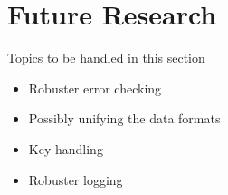 \section{Future Research}

Topics to be handled in this section

\begin{itemize}
\item {Robuster  error checking}
\item {Possibly unifying the data formats}
\item {Key handling}
\item {Robuster logging}
\end{itemize}